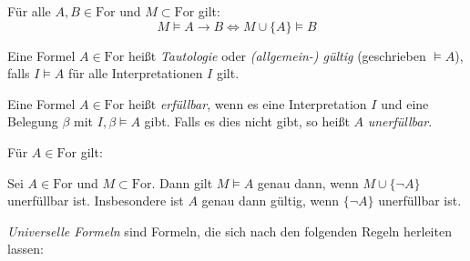 \documentclass{cheat-sheet}
\newcommand{\Ibm}{I, \beta \models}
\newcommand{\For}{\mathrm{For}}
\begin{document}
\begin{satz}
  Für alle $A, B \in \For$ und $M \subset \For$ gilt:
  \[ M \models A \to B \iff M \cup \{A\} \models B \]
\end{satz}

\begin{defn}
  Eine Formel $A \in \For$ heißt \emph{Tautologie} oder \emph{(allgemein-) gültig} (geschrieben $\models A$), falls $I \models A$ für alle Interpretationen $I$ gilt.
\end{defn}

\begin{defn}
  Eine Formel $A \in \For$ heißt \emph{erfüllbar}, wenn es eine Interpretation $I$ und eine Belegung $\beta$ mit $\Ibm A$ gibt. Falls es dies nicht gibt, so heißt $A$ \emph{unerfüllbar}.
\end{defn}

\begin{satz}
  Für $A \in \For$ gilt:
  \begin{itemize}
  \end{itemize}
\end{satz}

\begin{satz}
  Sei $A \in \For$ und $M \subset \For$. Dann gilt $M \models A$ genau dann, wenn $M \cup \{ \neg A \}$ unerfüllbar ist. Insbesondere ist $A$ genau dann gültig, wenn $\{ \neg A \}$ unerfüllbar ist.
\end{satz}



\begin{defn}
  \emph{Universelle Formeln} sind Formeln, die sich nach den folgenden Regeln herleiten lassen:

  \begin{minipage}{0.32\linewidth}
    \begin{prooftree}
    \end{prooftree}
  \end{minipage}
  \begin{minipage}{0.21\linewidth}
    \begin{prooftree}
    \end{prooftree}
  \end{minipage}
  \begin{minipage}{0.21\linewidth}
    \begin{prooftree}
    \end{prooftree}
  \end{minipage}
  \begin{minipage}{0.21\linewidth}
    \begin{prooftree}
    \end{prooftree}
  \end{minipage}
\end{defn}
\end{document}
